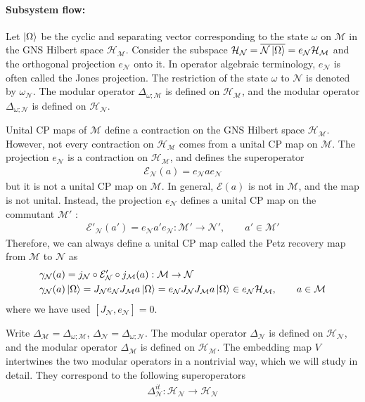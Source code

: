 \documentclass[a4paper,11pt]{article}
\theoremstyle{definition}
\newcommand{\nn}{\nonumber}
\newcommand{\mN}{\mathcal{N}}
\newcommand{\mH}{\mathcal{H}}
\newcommand{\mM}{\mathcal{M}}
\newcommand{\mE}{\mathcal{E}}
\begin{document}
\paragraph{Subsystem flow:} Let $\ket{\Omega}$ be the cyclic and separating vector corresponding to the state $\omega$ on $\mM$ in the GNS Hilbert space $\mH_\mM$. Consider the subspace $\mH_\mN=\overline{\mN\ket{\Omega}}=e_\mN\mH_\mM$ and the orthogonal projection $e_\mN$ onto it. In operator algebraic terminology, $e_\mN$ is often called the Jones projection. The restriction of the state $\omega$ to $\mN$ is denoted by $\omega_\mN$. The modular operator $\Delta_{\omega;\mM}$ is defined on $\mH_\mM$, and the modular operator $\Delta_{\omega;\mN}$ is defined on $\mH_\mN$. 

Unital CP maps of $\mM$ define a contraction on the GNS Hilbert space $\mH_\mM$. However, not every contraction on $\mH_\mM$ comes from a unital CP map on $\mM$. The projection $e_\mN$ is a contraction on $\mH_\mM$, and defines the superoperator
\begin{align}
\mE_\mN(a)=e_\mN a e_\mN
\end{align}
but it is not a unital CP map on $\mM$. In general, $\mE(a)$ is not in $\mM$, and the map is not unital. Instead, the projection $e_\mN$ defines a unital CP map on the commutant $\mM'$ \cite  {AccardiCecchini1982}:
\begin{align}
\mE'_{\mN}(a')=e_\mN a' e_\mN:\mM'\to \mN',\qquad a'\in\mM'
\end{align}
Therefore, we can always define a unital CP map called the Petz recovery map \cite{Petz1986,Petz1988} from $\mM$ to $\mN$ as 
\begin{align}
&\gamma_\mN(a)=j_\mN\circ \mE'_{\mN}\circ j_\mM(a):\mM\to \mN\nn\\
&\gamma_\mN(a)\ket{\Omega}=J_\mN e_\mN J_\mM a\ket{\Omega}=e_\mN J_\mN J_\mM a\ket{\Omega}\in e_\mN\mH_\mM,\qquad a\in\mM
\end{align}
where we have used $[J_\mN,e_\mN]=0$.

Write $\Delta_{\mM}=\Delta_{\omega;\mM}$, $\Delta_{\mN}=\Delta_{\omega;\mN}$. The modular operator $\Delta_{\mN}$ is defined on $\mH_{\mN}$, and the modular operator $\Delta_{\mM}$ is defined on $\mH_{\mM}$. The embedding map $V$ intertwines the two modular operators in a nontrivial way, which we will study in detail. They correspond to the following superoperators
\begin{align}
\Delta_{\mN}^{it}:\mH_\mN\to\mH_\mN
\end{align}
\end{document}
